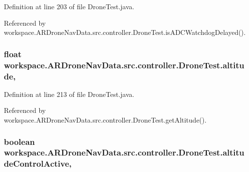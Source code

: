 Definition at line 203 of file Drone\+Test.\+java.



Referenced by workspace.\+A\+R\+Drone\+Nav\+Data.\+src.\+controller.\+Drone\+Test.\+is\+A\+D\+C\+Watchdog\+Delayed().

\hypertarget{classworkspace_1_1_a_r_drone_nav_data_1_1src_1_1controller_1_1_drone_test_a96af0aa5257780f2230c98811fb0f8ba}{}
\subsubsection[{altitude}]{\setlength{\rightskip}{0pt plus 5cm}float workspace.\+A\+R\+Drone\+Nav\+Data.\+src.\+controller.\+Drone\+Test.\+altitude\hspace{0.3cm}{\ttfamily [static]}, {\ttfamily [protected]}}\label{classworkspace_1_1_a_r_drone_nav_data_1_1src_1_1controller_1_1_drone_test_a96af0aa5257780f2230c98811fb0f8ba}


Definition at line 213 of file Drone\+Test.\+java.



Referenced by workspace.\+A\+R\+Drone\+Nav\+Data.\+src.\+controller.\+Drone\+Test.\+get\+Altitude().

\hypertarget{classworkspace_1_1_a_r_drone_nav_data_1_1src_1_1controller_1_1_drone_test_a4ee03462425a581ac02e382af53e8f25}{}
\subsubsection[{altitude\+Control\+Active}]{\setlength{\rightskip}{0pt plus 5cm}boolean workspace.\+A\+R\+Drone\+Nav\+Data.\+src.\+controller.\+Drone\+Test.\+altitude\+Control\+Active\hspace{0.3cm}{\ttfamily [static]}, {\ttfamily [protected]}}\label{classworkspace_1_1_a_r_drone_nav_data_1_1src_1_1controller_1_1_drone_test_a4ee03462425a581ac02e382af53e8f25}


